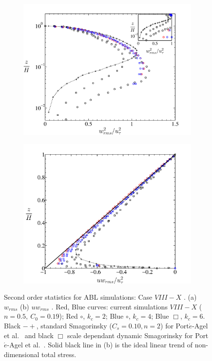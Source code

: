 \begin{figure}
        \centering
        \begin{subfigure}[t]{0.75\textwidth}
                \includegraphics[width=\linewidth]{Fig3/wrms_filter_n05.pdf}
                \caption{}
                \label{fig:wrms1}
        \end{subfigure}
        \centering
        \begin{subfigure}[t]{0.75\textwidth}
                \includegraphics[width=\linewidth]{Fig3/uwrms_filter_n05.pdf}
                \caption{}
                \label{fig:uwrms1}
        \end{subfigure}%
        \caption[Second order statistics $w_{rms}, \ uw_{rms}$, Case $VIII-X$ ]{Second order statistics for ABL simulations: Case $VIII-X$ . (a) $w_{rms}$ (b) $uw_{rms}$ . Red, Blue curves: current simulations $VIII-X$ ($n = 0.5, \ C_0 = 0.19$);  Red $\circ$, $k_{c}=2$; Blue $\circ$, $k_{c} = 4$; Blue $\Box$, $k_{c} = 6$.  Black $-+$, standard Smagorinsky ($C_s = 0.10, n = 2$) {for Port$\acute{e}$-Agel et al.~\cite{porte1fun}} and black $\Box$ scale dependant dynamic Smagorinsky for Port$\acute{e}$-Agel et al.~\cite{porte1fun}. Solid black line in (b) is the ideal linear trend of non-dimensional total stress.}\label{fig:stat022}
\end{figure}

